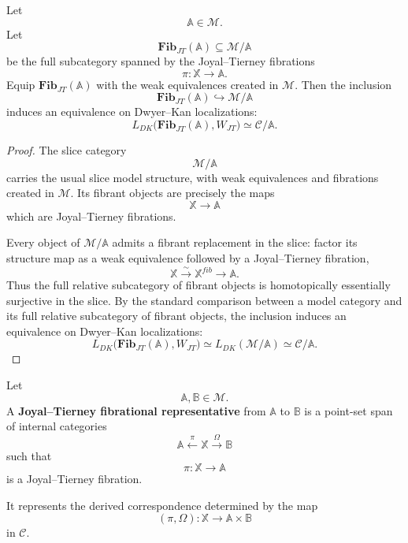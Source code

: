 \begin{proposition}
\label{prop:jt-fibrations-present-derived-slice}
Let
\[
\mathbb A\in\mathcal M.
\]
Let
\[
\mathbf{Fib}_{JT}(\mathbb A)
\subseteq
\mathcal M/\mathbb A
\]
be the full subcategory spanned by the Joyal--Tierney fibrations
\[
\pi:\mathbb X\to\mathbb A.
\]
Equip \(\mathbf{Fib}_{JT}(\mathbb A)\) with the weak equivalences created
in \(\mathcal M\). Then the inclusion
\[
\mathbf{Fib}_{JT}(\mathbb A)
\hookrightarrow
\mathcal M/\mathbb A
\]
induces an equivalence on Dwyer--Kan localizations:
\[
L_{DK}\bigl(\mathbf{Fib}_{JT}(\mathbb A),W_{JT}\bigr)
\simeq
\mathcal C/\mathbb A.
\]
\end{proposition}

\begin{proof}
The slice category
\[
\mathcal M/\mathbb A
\]
carries the usual slice model structure, with weak equivalences and
fibrations created in \(\mathcal M\). Its fibrant objects are precisely
the maps
\[
\mathbb X\to\mathbb A
\]
which are Joyal--Tierney fibrations.

Every object of \(\mathcal M/\mathbb A\) admits a fibrant replacement in
the slice: factor its structure map as a weak equivalence followed by a
Joyal--Tierney fibration,
\[
\mathbb X
\xrightarrow{\sim}
\mathbb X^{fib}
\longrightarrow
\mathbb A.
\]
Thus the full relative subcategory of fibrant objects is homotopically
essentially surjective in the slice. By the standard comparison between
a model category and its full relative subcategory of fibrant objects,
the inclusion induces an equivalence on Dwyer--Kan localizations:
\[
L_{DK}\bigl(\mathbf{Fib}_{JT}(\mathbb A),W_{JT}\bigr)
\simeq
L_{DK}(\mathcal M/\mathbb A)
\simeq
\mathcal C/\mathbb A.
\]
\end{proof}

\begin{definition}
\label{def:point-set-fibrational-representative}
Let
\[
\mathbb A,\mathbb B\in\mathcal M.
\]
A \textbf{Joyal--Tierney fibrational representative} from
\(\mathbb A\) to \(\mathbb B\) is a point-set span of internal categories
\[
\mathbb A
\xleftarrow{\pi}
\mathbb X
\xrightarrow{\Omega}
\mathbb B
\]
such that
\[
\pi:\mathbb X\to\mathbb A
\]
is a Joyal--Tierney fibration.

It represents the derived correspondence determined by the map
\[
(\pi,\Omega):\mathbb X\to\mathbb A\times\mathbb B
\]
in \(\mathcal C\).
\end{definition}

